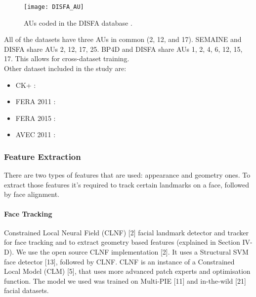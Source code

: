 \begin{figure}[H]
	\centering
	\texttt{[image: DISFA\_AU]}
	\caption{AUs coded in the DISFA database \cite{DISFA_AU}.}
	\label{fig:DISFA_AU}
\end{figure}
All of the datasets have three AUs in common (2, 12, and 17). SEMAINE and DISFA share AUs 2, 12, 17, 25. BP4D and DISFA share AUs 1, 2, 4, 6, 12, 15, 17. This allows for cross-dataset training.\\

Other dataset included in the study are:
\begin{itemize}[noitemsep]
\item CK+ \cite{CK+}:
\item FERA 2011 \cite{FERA11}:
\item FERA 2015 \cite{FERA15}:
\item AVEC 2011 \cite{AVEC11}:
\end{itemize}



\subsubsection{Feature Extraction}
There are two types of features that are used: appearance and geometry ones. To extract those features it's required to track certain landmarks on a face, followed by face alignment.\\

\paragraph{Face Tracking}
Constrained Local Neural Field (CLNF) [2] facial landmark detector and tracker for face tracking and to extract geometry based features (explained in Section IV-D). We use the open source CLNF implementation [2]. It uses a Structural SVM face detector [13], followed by CLNF.
CLNF is an instance of a Constrained Local Model (CLM) [5], that uses more advanced patch experts and optimisation function. The model we used was trained on Multi-PIE [11] and in-the-wild [21] facial datasets.


